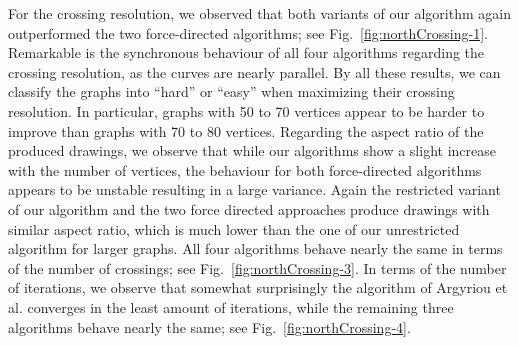 \documentclass[runningheads]{llncs}
\begin{document}
{For the crossing resolution, we observed that both variants of our algorithm again outperformed the two force-directed algorithms; see Fig.~\ref{fig:northCrossing-1}. Remarkable is the synchronous behaviour of all four algorithms regarding the crossing resolution, as the curves are nearly parallel. By all these results, we can classify the graphs into ``hard'' or ``easy'' when maximizing their crossing resolution. In particular, graphs with 50 to 70 vertices appear to be harder to improve than graphs with 70 to 80 vertices. Regarding the aspect ratio of the produced drawings, we observe that while our algorithms show a slight increase with the number of vertices, the behaviour for both force-directed algorithms appears to be unstable resulting in a large variance. Again the restricted variant of our algorithm and the two force directed approaches produce drawings with similar aspect ratio, which is much lower than the one of our unrestricted algorithm for larger graphs. All four algorithms behave nearly the same in terms of the number of crossings; see Fig.~\ref{fig:northCrossing-3}. In terms of the number of iterations, we observe that somewhat surprisingly the algorithm of Argyriou et al. converges in the least amount of iterations, while the remaining three algorithms behave nearly the same; see Fig.~\ref{fig:northCrossing-4}.

}
\end{document}
